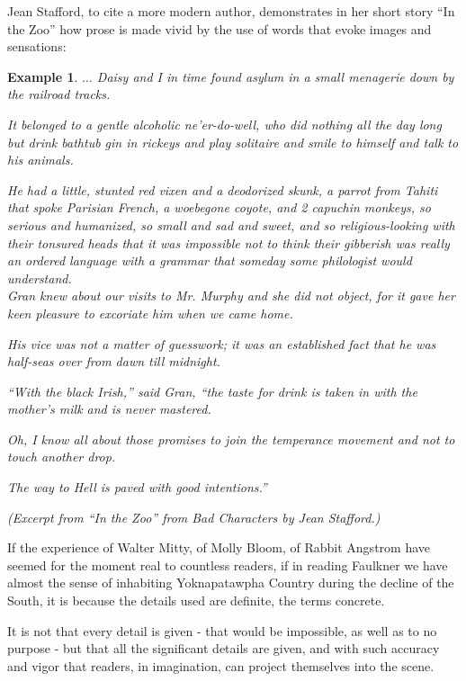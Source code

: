\documentclass{book}
\numberwithin{equation}{section}
\newtheorem{example}{Example}[chapter]
\begin{document}
%
Jean Stafford, to cite a more modern author, demonstrates in her short story ``In the Zoo'' how prose is made vivid by the use of words that evoke images and sensations:
\begin{example}
    $\ldots$ Daisy and I in time found asylum in a small menagerie down by the railroad tracks.
    
    It belonged to a gentle alcoholic ne'er-do-well, who did nothing all the day long but drink bathtub gin in rickeys and play solitaire and smile to himself and talk to his animals.
    
    He had a little, stunted red vixen and a deodorized skunk, a parrot from Tahiti that spoke Parisian French, a woebegone coyote, and 2 capuchin monkeys, so serious and humanized, so small and sad and sweet, and so religious-looking with their tonsured heads that it was impossible not to think their gibberish was really an ordered language with a grammar that someday some philologist would understand.
    \\
    
    Gran knew about our visits to Mr. Murphy and she did not object, for it gave her keen pleasure to excoriate him when we came home.
    
    His vice was not a matter of guesswork; it was an established fact that he was half-seas over from dawn till midnight.
    
    ``With the black Irish,'' said Gran, ``the taste for drink is taken in with the mother's milk and is never mastered.
    
    Oh, I know all about those promises to join the temperance movement and not to touch another drop.
    
    The way to Hell is paved with good intentions.''
    
    \begin{flushright}
        (Excerpt from ``In the Zoo'' from Bad Characters by Jean Stafford.)
    \end{flushright}
\end{example}
If the experience of Walter Mitty, of Molly Bloom, of Rabbit Angstrom have seemed for the moment real to countless readers, if in reading Faulkner we have almost the sense of inhabiting Yoknapatawpha Country during the decline of the South, it is because the details used are definite, the terms concrete.

It is not that every detail is given - that would be impossible, as well as to no purpose - but that all the significant details are given, and with such accuracy and vigor that readers, in imagination, can project themselves into the scene.
\end{document}
